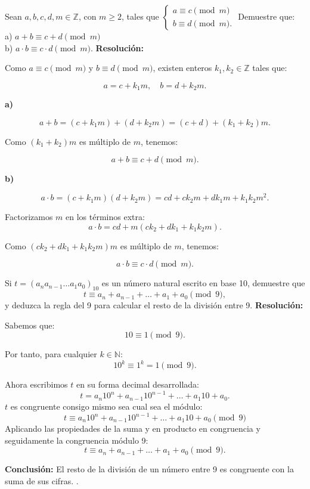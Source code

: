 \documentclass[a4paper,12pt]{article}
\begin{document}
\begin{ejercicio}[title=Ejercicio 22]
Sean $a,b,c,d,m \in \mathbb{Z}$, con $m \ge 2$, tales que 
\(
\begin{cases}
    a \equiv c \pmod{m} \\
    b \equiv d \pmod{m}.
\end{cases}
\) 
Demuestre que: \\
a) $a+b \equiv c+d \pmod{m}$ \\
b) $a \cdot b \equiv c \cdot d \pmod{m}$.
\tcblower
\textbf{Resolución:}

Como $a \equiv c \pmod{m}$ y $b \equiv d \pmod{m}$, existen enteros $k_1, k_2 \in \mathbb{Z}$ tales que:

\[
a = c + k_1 m, \quad b = d + k_2 m.
\]

\textbf{a)}  

\[
a + b = (c + k_1 m) + (d + k_2 m) = (c + d) + (k_1 + k_2)m.
\]

Como $(k_1 + k_2)m$ es múltiplo de $m$, tenemos:

\[
\boxed{a + b \equiv c + d \pmod{m}}.
\]

\textbf{b)}  

\[
a \cdot b = (c + k_1 m)(d + k_2 m) = cd + c k_2 m + d k_1 m + k_1 k_2 m^2.
\]

\vspace{0.5em}

Factorizamos $m$ en los términos extra:
\[
a \cdot b = cd + m(c k_2 + d k_1 + k_1 k_2 m).
\]

Como $(c k_2 + d k_1 + k_1 k_2 m)m$ es múltiplo de $m$, tenemos:

\[
\boxed{a \cdot b \equiv c \cdot d \pmod{m}}.
\]

\end{ejercicio}

\begin{ejercicio}[title=Ejercicio 23]
Si $t = (a_n a_{n-1} \dots a_1 a_0)_{10}$ es un número natural escrito en base 10, demuestre que
\[
t \equiv a_n + a_{n-1} + \dots + a_1 + a_0 \pmod{9},
\]
y deduzca la regla del 9 para calcular el resto de la división entre 9.
\tcblower
\textbf{Resolución:}

Sabemos que:
\[
10 \equiv 1 \pmod{9}.
\]

Por tanto, para cualquier $k \in \mathbb{N}$:
\[
10^k \equiv 1^k = 1 \pmod{9}.
\]

Ahora escribimos $t$ en su forma decimal desarrollada:
\[
t = a_n 10^n + a_{n-1} 10^{n-1} + \dots + a_1 10 + a_0.
\]
$t$ es congruente consigo mismo sea cual sea el módulo:
\[
t \equiv a_n 10^n + a_{n-1} 10^{n-1} + \dots + a_1 10 + a_0 \pmod{9}
\]
Aplicando las propiedades de la suma y en producto en congruencia y seguidamente la congruencia módulo 9:
\[
\boxed{t \equiv a_n + a_{n-1} + \dots + a_1 + a_0 \pmod{9}}.
\]

\textbf{Conclusión:} El resto de la división de un número entre 9 es congruente con la suma de sus cifras. .
\end{ejercicio}
\end{document}
